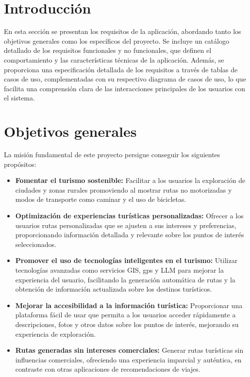 
\section{Introducción}
En esta sección se presentan los requisitos de la aplicación, abordando tanto los objetivos generales como los específicos del proyecto. Se incluye un catálogo detallado de los requisitos funcionales y no funcionales, que definen el comportamiento y las características técnicas de la aplicación. Además, se proporciona una especificación detallada de los requisitos a través de tablas de casos de uso, complementadas con su respectivo diagrama de casos de uso, lo que facilita una comprensión clara de las interacciones principales de los usuarios con el sistema.


\section{Objetivos generales}
La misión fundamental de este proyecto persigue conseguir los siguientes propósitos:
\begin{itemize}
	\item \textbf{Fomentar el turismo sostenible:} Facilitar a los usuarios la exploración de ciudades y zonas rurales promoviendo al mostrar rutas no motorizadas y modos de transporte como caminar y el uso de bicicletas.
	
	\item \textbf{Optimización de experiencias turísticas personalizadas:} Ofrecer a los usuarios rutas personalizadas que se ajusten a sus intereses y preferencias, proporcionando información detallada y relevante sobre los puntos de interés seleccionados.
	
	\item \textbf{Promover el uso de tecnologías inteligentes en el turismo:} Utilizar tecnologías avanzadas como servicios GIS, \gls{gps} y LLM para mejorar la experiencia del usuario, facilitando la generación automática de rutas y la obtención de información actualizada sobre los destinos turísticos.
	
	\item \textbf{Mejorar la accesibilidad a la información turística:} Proporcionar una plataforma fácil de usar que permita a los usuarios acceder rápidamente a descripciones, fotos y otros datos sobre los puntos de interés, mejorando su experiencia de exploración.
	
	\item \textbf{Rutas generadas sin intereses comerciales:} Generar rutas turísticas sin influencias comerciales, ofreciendo una experiencia imparcial y auténtica, en contraste con otras aplicaciones de recomendaciones de viajes.
\end{itemize}

